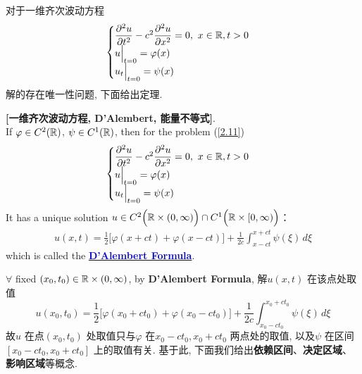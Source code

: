 	\vspace*{6em}
	
	对于一维齐次波动方程
	\begin{align}
		\begin{cases}
			\dfrac{\partial^2 u}{\partial t^2} - c^2 \dfrac{\partial^2 u}{\partial x^2} = 0 , \,\, x \in \mathbb{R} , t > 0 \\
			u \Big|_{t = 0} = \varphi(x) \\
			u_t \Big|_{t = 0} = \psi(x)
		\end{cases}\label{2.11}
	\end{align}
	解的存在唯一性问题, 下面给出定理. 
	
	\newpage
	
	\begin{thm}\label{thm 2.3.1}
		\textbf{[一维齐次波动方程, D'Alembert, 能量不等式]}. \\
		If $\varphi \in C^2(\mathbb{R})$, $\psi \in C^1(\mathbb{R})$, then for the problem (\ref{2.11})
		\begin{align*}
			\begin{cases}
				\dfrac{\partial^2 u}{\partial t^2} - c^2 \dfrac{\partial^2 u}{\partial x^2} = 0 , \,\, x \in \mathbb{R} , t > 0 \\
				u \Big|_{t = 0} = \varphi(x) \\
				u_t \Big|_{t = 0} = \psi(x)
			\end{cases}
		\end{align*}
		It has a unique solution $u \in C^2 \Big( \mathbb{R} \times (0 , \infty) \Big) \cap C^1 \Big( \mathbb{R} \times [0 , \infty) \Big)$：
		\begin{align}
			u(x , t) = \frac{1}{2} \Big[ \varphi(x + ct) + \varphi(x - ct) \Big] + \frac{1}{2c} \int_{x - ct}^{x + ct} \psi(\xi) \, d\xi \label{2.12}
		\end{align}
		which is called the \underline{\textcolor{blue}{\textbf{D'Alembert Formula}}}. 
		
		\vspace*{8em}
		
		\begin{rmk}
			$\forall$ fixed $(x_0 , t_0) \in \mathbb{R} \times (0 , \infty)$, by \textbf{D'Alembert Formula}, 解$u(x , t)$ 在该点处取值
			\[ u(x_0 , t_0) = \frac{1}{2} \Big[ \varphi(x_0 + ct_0) + \varphi(x_0 - ct_0) \Big] + \frac{1}{2c} \int_{x_0 - ct_0}^{x_0 + ct_0} \psi(\xi) \, d\xi \]
			故$u$ 在点$(x_0 , t_0)$ 处取值只与$\varphi$ 在$x_0 - ct_0 , x_0 + ct_0$ 两点处的取值, 以及$\psi$ 在区间$[x_0 - ct_0 , x_0 + ct_0]$ 上的取值有关. 基于此, 下面我们给出\textbf{依赖区间}、\textbf{决定区域}、\textbf{影响区域}等概念. 
			

\end{rmk}
\end{thm}
